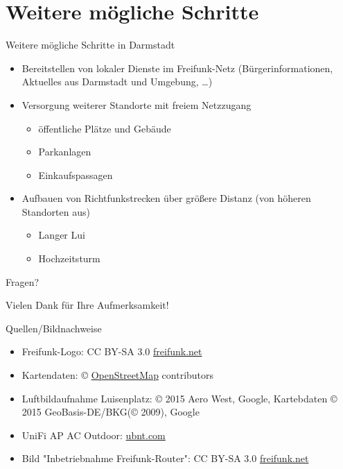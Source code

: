 \documentclass{beamer}
\begin{document}
\section{Weitere mögliche Schritte}
\begin{frame}{Weitere mögliche Schritte in Darmstadt}
\begin{itemize}
\item Bereitstellen von lokaler Dienste im Freifunk-Netz (Bürgerinformationen, Aktuelles aus Darmstadt und Umgebung, \ldots)
\item Versorgung weiterer Standorte mit freiem Netzzugang
\begin{itemize}
	\item öffentliche Plätze und Gebäude
	\item Parkanlagen
	\item Einkaufspassagen
\end{itemize}
\item Aufbauen von Richtfunkstrecken über größere Distanz (von höheren Standorten aus)
\begin{itemize}
	\item Langer Lui
	\item Hochzeitsturm
\end{itemize}
\end{itemize}
\vfill
\end{frame}

\begin{frame}
\begin{center}
\Huge Fragen?
\end{center}
\end{frame}


\begin{frame}
\begin{center}
\Huge Vielen Dank für Ihre Aufmerksamkeit!
\end{center}
\end{frame}

\begin{frame}{Quellen/Bildnachweise}
\begin{itemize}
	\item Freifunk-Logo: CC BY-SA 3.0 \href{http://freifunk.net}{freifunk.net}
	\item Kartendaten: © \href{http://openstreetmap.org}{OpenStreetMap} contributors
	\item Luftbildaufnahme Luisenplatz: © 2015 Aero West, Google, Kartebdaten © 2015 GeoBasis-DE/BKG(© 2009), Google
	\item UniFi AP AC Outdoor:  \href{ubnt.com}{ubnt.com}
	\item Bild "Inbetriebnahme Freifunk-Router": CC BY-SA 3.0 \href{http://freifunk.net}{freifunk.net}
\end{itemize}
\end{frame}
\end{document}
